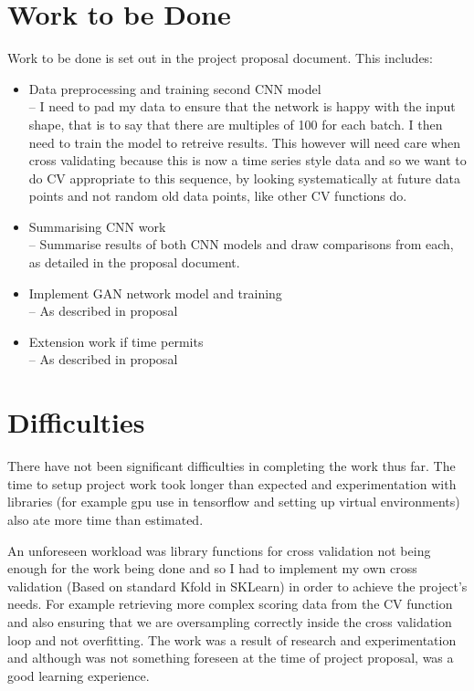 \documentclass[12pt,a4paper,twoside]{article}
\begin{document}
 \section*{Work to be Done}
 
 Work to be done is set out in the project proposal document. This includes:
  \begin{itemize}
 \item Data preprocessing and training second CNN model \\
 -- I need to pad my data to ensure that the network is happy with the input shape, that is to say that there are multiples of 100 for each batch. I then need to train the model to retreive results. This however will need care when cross validating because this is now a time series style data and so we want to do CV appropriate to this sequence, by looking systematically at future data points and not random old data points, like other CV functions do. 
 
 \item Summarising CNN work \\
 -- Summarise results of both CNN models and draw comparisons from each, as detailed in the proposal document.
 \item Implement GAN network model and training \\
 -- As described in proposal
 \item Extension work if time permits \\
 -- As described in proposal
 \end{itemize}
  
 \section*{Difficulties}
 
 There have not been significant difficulties in completing the work thus far. The time to setup project work took longer than expected and experimentation with libraries (for example gpu use in tensorflow and setting up virtual environments) also ate more time than estimated. 
 
 An unforeseen workload was library functions for cross validation not being enough for the work being done and so I had to implement my own cross validation (Based on standard Kfold in SKLearn) in order to achieve the project's needs. For example retrieving more complex scoring data from the CV function and also ensuring that we are oversampling correctly inside the cross validation loop and not overfitting. The work was a result of research and experimentation and although was not something foreseen at the time of project proposal, was a good learning experience.
 
 



\end{document}

